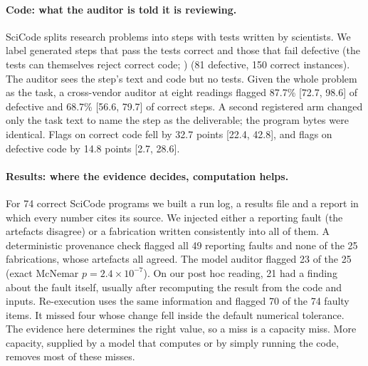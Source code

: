 \paragraph{Code: what the auditor is told it is reviewing.} SciCode \citep{tian2024scicode} splits research problems
into steps with tests written by scientists. We label generated steps that pass the tests correct and those that fail defective (the tests can themselves
reject correct code; \citealp{hu2026scicodeverified}) (81 defective, 150 correct instances). The auditor sees the step's text and code but no tests.
Given the whole problem as the task, a cross-vendor auditor at eight readings flagged 87.7\% [72.7, 98.6] of
defective and 68.7\% [56.6, 79.7] of correct steps. A second registered arm changed only the task text to name the step as the deliverable;
the program bytes were identical. Flags on correct code fell by 32.7 points [22.4, 42.8], and flags on defective code
by 14.8 points [2.7, 28.6].

\paragraph{Results: where the evidence decides, computation helps.} For 74 correct SciCode programs we built a run
log, a results file and a report in which every number cites its source. We injected either a reporting fault
(the artefacts disagree) or a fabrication written consistently into all of them. A deterministic provenance
check flagged all 49 reporting faults and none of the 25 fabrications, whose artefacts all agreed.
The model auditor flagged 23 of the 25 (exact McNemar $p=2.4\times10^{-7}$). On our post hoc reading, 21 had a
finding about the fault itself, usually after recomputing the result from the code and inputs.
Re-execution uses the same information and flagged 70 of the 74 faulty items.
It missed four whose change fell inside the default numerical tolerance. The evidence here determines the
right value, so a miss is a capacity miss. More capacity, supplied by a model that computes or by simply running the
code, removes most of these misses.

